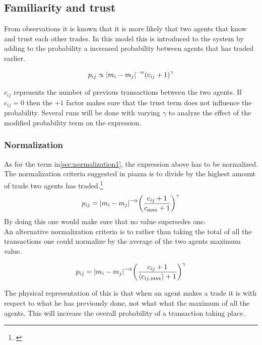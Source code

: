 \subsection{Familiarity and trust}
\label{sec:familiarity and trust}
From observations it is known that it is more likely that two agents that know and trust each other trades. In this model this is introduced to the system by adding to the probability a increased probability between agents that has traded earlier.

\begin{align}
	p_{ij}\propto \abs{m_i-m_j}^{-\alpha}\qty(c_{ij}+1)^\gamma\label{eq:roughtrust}
\end{align}

$c_{ij}$ represents the number of previous transactions between the two agents. If $c_{ij}=0$ then the $+1$ factor makes sure that the trust term does not influence the probability. Several runs will be done with varying $\gamma$ to analyze the effect of the modified probability term on the expression.


\subsubsection{Normalization}
\label{sec:normalization2}

As for the term in\ref{sec:normalization1}, the expression above has to be normalized. The normalization criteria suggested in piazza is to divide by the highest amount of trade two agents has traded.\footnote{\href{https://piazza.com/class/j6owewp05ym46p?cid=126}{\color{blue}{Piazza: Morten's suggestion} }}
\begin{align}
p_{ij}= \abs{m_i-m_j}^{-\alpha}\qty(\frac{c_{ij}+1}{c_{\mathrm{max}}+1})^\gamma\label{eq:reformedtrust}
\end{align}
By doing this one would make sure that no value supersedes one.\\

An alternative normalization criteria is to rather than taking the total of all the transactions one could normalize by the average of the two agents maximum value.

\begin{align}
p_{ij}= \abs{m_i-m_j}^{-\alpha}\qty(\frac{c_{ij}+1}{\langle c_{ij \mathrm{, max}}  \rangle + 1})^\gamma\label{eq:BESTtrust}
\end{align}

The physical representation of this is that when an agent makes a trade it is with respect to what he has previously done, not what what the maximum of all the agents. This will increase the overall probability of a transaction taking place. 

